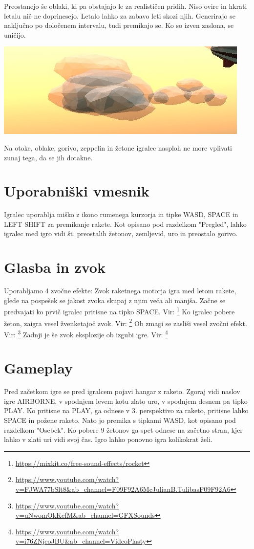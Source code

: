 \documentclass[a4paper]{article}
\begin{document}
Preostanejo še oblaki, ki pa obstajajo le za realističen pridih. Niso ovire in hkrati letalu nič ne doprinesejo. Letalo lahko za zabavo leti skozi njih. Generirajo se naključno po določenem intervalu, tudi premikajo se. Ko so izven zaslona, se uničijo.
\begin{center}
     \includegraphics[width=\columnwidth]{oblaki.jpg}
\end{center}

Na otoke, oblake, gorivo, zeppelin in žetone igralec nasploh ne more vplivati zunaj tega, da se jih dotakne. 

\section{Uporabniški vmesnik}
Igralec uporablja miško z ikono rumenega kurzorja in tipke WASD, SPACE in LEFT SHIFT za premikanje rakete. Kot opisano pod razdelkom "Pregled", lahko igralec med igro vidi št. preostalih žetonov, zemljevid, uro in preostalo gorivo.

\section{Glasba in zvok}
Uporabljamo 4 zvočne efekte:
Zvok raketnega motorja igra med letom rakete, glede na pospešek se jakost zvoka skupaj z njim veča ali manjša. Začne se predvajati ko prvič igralec pritisne na tipko SPACE. Vir: \footnote{\url{https://mixkit.co/free-sound-effects/rocket}}
Ko igralec pobere žeton, zaigra vesel žvenketajoč zvok. Vir: \footnote{\url{https://www.youtube.com/watch?v=FJWA77bSlt8&ab_channel=F09F92A6McJulianB.TulibasF09F92A6}}
Ob zmagi se zasliši vesel zvočni efekt. Vir: \footnote{\url{https://www.youtube.com/watch?v=uNwomOkKefM&ab_channel=GFXSounds}}
Zadnji je še zvok eksplozije ob izgubi igre. Vir: \footnote{\url{https://www.youtube.com/watch?v=i76ZNjeoJBU&ab_channel=VideoPlasty}}

\section{Gameplay}
Pred začetkom igre se pred igralcem pojavi hangar z raketo. Zgoraj vidi naslov igre AIRBORNE, v spodnjem levem kotu zlato uro, v spodnjem desnem pa tipko PLAY. Ko pritisne na PLAY, ga odnese v 3. perspektivo za raketo, pritisne lahko SPACE in požene raketo. Nato jo premika s tipkami WASD, kot opisano pod razdelkom "Osebek". Ko pobere 9 žetonov ga spet odnese na začetno stran, kjer lahko v zlati uri vidi svoj čas. Igro lahko ponovno igra kolikokrat želi.
\end{document}

